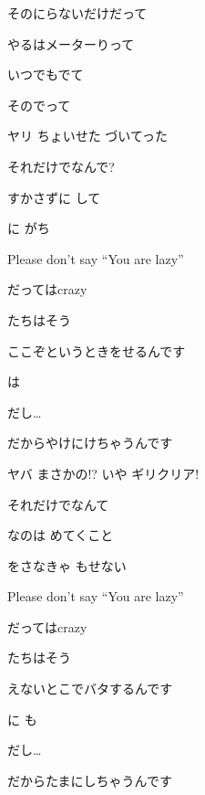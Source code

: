 \documentclass[14pt]{ltjsarticle}
\begin{document}
{\item
  そのにらないだけだって
  \jisho{}

  やるはメーターりって
  \jisho{}

  いつでもでて
  \jisho{}

  そのでって
  \jisho{}

\item
  ヤリ ちょいせた づいてった
  \jisho{}

  それだけでなんで? 
  \jisho{}

  すかさずに して
  \jisho{}

  に がち
  \jisho{}

\item
  Please don't say ``You are lazy''
  \jisho{}

  だってはcrazy
  \jisho{}

  たちはそう
  \jisho{}

  ここぞというときをせるんです
  \jisho{}

     は 
  \jisho{}

  だし…
  \jisho{}

  だからやけにけちゃうんです
  \jisho{}

\item
  ヤバ まさかの!? いや ギリクリア!
  \jisho{}

  それだけでなんて
  \jisho{}

  なのは めてくこと
  \jisho{}

  をさなきゃ もせない
  \jisho{}

\item
  Please don't say ``You are lazy''
  \jisho{}

  だってはcrazy
  \jisho{}

  たちはそう
  \jisho{}

  えないとこでバタするんです
  \jisho{}

  に  も
  \jisho{}

  だし…
  \jisho{}

  だからたまにしちゃうんです
  \jisho{}

}
\end{document}
